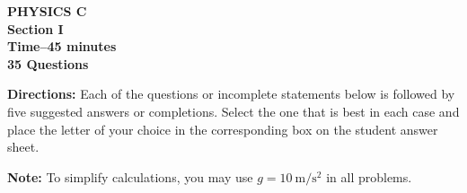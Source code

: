 \documentclass[12pt]{exam}
\begin{document}
\begin{center}
  \textbf{PHYSICS C\\
    Section I\\
    Time--45 minutes\\
    35 Questions
  }
\end{center}
\raggedcolumns

\textbf{Directions:} Each of the questions or incomplete statements below is
followed by five suggested answers or completions. Select the one that is best
in each case and place the letter of your choice in the corresponding box on
the student answer sheet.

\vspace{.2in}\textbf{Note:} To simplify calculations, you may use
$g=\SI{10}{\metre\per\second\squared}$ in all problems.
\end{document}

